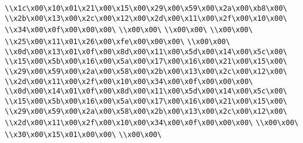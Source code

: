 \verb|\\x1c\x00\x10\x01\x21\x00\x15\x00\x29\x00\x59\x00\x2a\x00\xb8\x00\|\newline
\verb|\\x2b\x00\x13\x00\x2c\x00\x12\x00\x2d\x00\x11\x00\x2f\x00\x10\x00\|\newline
\verb|\\x34\x00\x0f\x00\x00\x00\|\newline
\verb|\\x00\x00\|\newline
\verb|\\x00\x00\|\newline
\verb|\\x00\x00\|\newline
\verb|\\x25\x00\x11\x01\x26\x00\xfe\x00\x00\x00\|\newline
\verb|\\x00\x00\|\newline
\verb|\\x0d\x00\x13\x01\x0f\x00\x8d\x00\x11\x00\x5d\x00\x14\x00\x5c\x00\|\newline
\verb|\\x15\x00\x5b\x00\x16\x00\x5a\x00\x17\x00\x16\x00\x21\x00\x15\x00\|\newline
\verb|\\x29\x00\x59\x00\x2a\x00\x58\x00\x2b\x00\x13\x00\x2c\x00\x12\x00\|\newline
\verb|\\x2d\x00\x11\x00\x2f\x00\x10\x00\x34\x00\x0f\x00\x00\x00\|\newline
\verb|\\x0d\x00\x14\x01\x0f\x00\x8d\x00\x11\x00\x5d\x00\x14\x00\x5c\x00\|\newline
\verb|\\x15\x00\x5b\x00\x16\x00\x5a\x00\x17\x00\x16\x00\x21\x00\x15\x00\|\newline
\verb|\\x29\x00\x59\x00\x2a\x00\x58\x00\x2b\x00\x13\x00\x2c\x00\x12\x00\|\newline
\verb|\\x2d\x00\x11\x00\x2f\x00\x10\x00\x34\x00\x0f\x00\x00\x00\|\newline
\verb|\\x00\x00\|\newline
\verb|\\x30\x00\x15\x01\x00\x00\|\newline
\verb|\\x00\x00\|\newline
